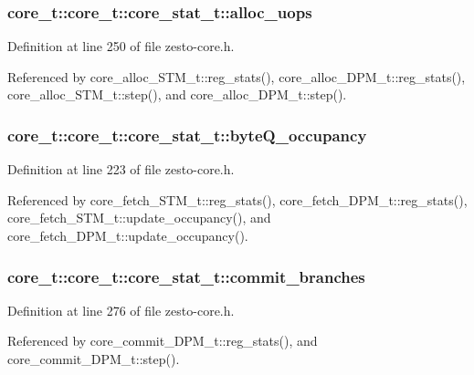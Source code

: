 \subsubsection[{alloc\_\-uops}]{ core\_\-t::core\_\-t::core\_\-stat\_\-t::alloc\_\-uops}\label{structcore__t_1_1core__stat__t_0a9cce5016426cc71e61332c4d66a930}




Definition at line 250 of file zesto-core.h.

Referenced by core\_\-alloc\_\-STM\_\-t::reg\_\-stats(), core\_\-alloc\_\-DPM\_\-t::reg\_\-stats(), core\_\-alloc\_\-STM\_\-t::step(), and core\_\-alloc\_\-DPM\_\-t::step().
\subsubsection[{byteQ\_\-occupancy}]{ core\_\-t::core\_\-t::core\_\-stat\_\-t::byteQ\_\-occupancy}\label{structcore__t_1_1core__stat__t_a364f8fb635bb5006f65c7ca4447efa4}




Definition at line 223 of file zesto-core.h.

Referenced by core\_\-fetch\_\-STM\_\-t::reg\_\-stats(), core\_\-fetch\_\-DPM\_\-t::reg\_\-stats(), core\_\-fetch\_\-STM\_\-t::update\_\-occupancy(), and core\_\-fetch\_\-DPM\_\-t::update\_\-occupancy().
\subsubsection[{commit\_\-branches}]{ core\_\-t::core\_\-t::core\_\-stat\_\-t::commit\_\-branches}\label{structcore__t_1_1core__stat__t_ab2545830130a7d2c6cc828e896bee0b}




Definition at line 276 of file zesto-core.h.

Referenced by core\_\-commit\_\-DPM\_\-t::reg\_\-stats(), and core\_\-commit\_\-DPM\_\-t::step().
